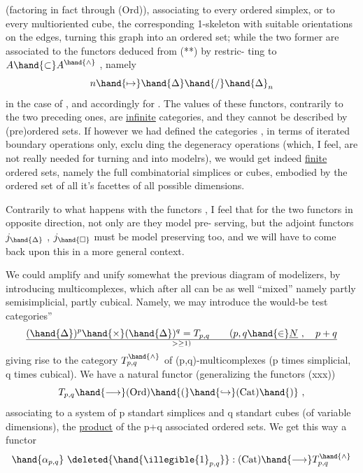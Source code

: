 (factoring in fact through (Ord)), associating to every ordered simplex,
or to every multioriented cube, \quad the corresponding 1-skeleton with suitable
orientations on the edges, turning  this graph into an ordered set; \quad while
the two former are associated to the functors deduced from (**) by restric-%
ting to $A \hand{\subset} A^{\hand{\wedge}}$ , \quad namely
\[ n \hand{\mapsto} \hand{\Delta}\hand{/}\hand{\Delta}_n \]
in the case of \hand{$\Delta$}, \quad and accordingly for \hand{$\square$}. \quad The values of these functors,
contrarily to the two preceding ones, \quad are \uline{infinite} categories, \quad and they
cannot be described by  (pre)ordered sets. \quad If however we had defined
the categories \hand{$\Delta$} , \hand{$\square$} \quad in terms of iterated boundary operations only, \quad exclu%
ding the degeneracy operations (which, \quad I feel, \quad are not really needed for
turning \hand{$\Delta^\wedge$} and \hand{$\square^\wedge$} into modelrs), \quad we would get indeed \uline{finite} ordered
sets, \quad namely the full combinatorial simplices or cubes,  embodied by the
ordered set of all it's facettes of all possible dimensions.

Contrarily to what happens with the functors \hand{$\alpha$, $\beta$}, \quad I feel that for
the two functors \hand{$\xi,\eta$} in opposite direction, \quad not only are they model pre-%
serving, \quad but the  adjoint functors \quad $j_{\hand{\Delta}}$ , $j_{\hand{\square}}$ must be model preserving too,
and we will have to come back upon this in a more general context.

We could amplify and unify somewhat the previous diagram of modelizers,
by introducing multicomplexes, \quad which after all can be as well ``mixed''
namely partly semisimplicial, \quad partly cubical. \quad Namely, \quad we may introduce
the would-be test categories'' 
\[ (\hand{\Delta})^p \hand{\times} (\hand{\Delta})^q = T_{p,q} \qquad (p,q \hand{\in} \underline{N} \ , \quad p+q \over{>}{\geq} 1) \]
giving rise to the category \quad $T^{\hand{\wedge}}_{p,q}$  \quad of (p,q)-multicomplexes (p times
simplicial, q times cubical). \quad {} We have a natural functor (generalizing
the functors (xxx))
\[ T_{p,q} \hand{\longrightarrow} \text{(Ord)} \hand{(} \hand{\hookrightarrow} \text{(Cat)} \hand{)} \ , \]
associating to a system of p standart simplices and q standart cubes
(of variable dimensions), \quad the \uline{product} of the p+q associated ordered sets.
We get this way a functor
\[ \hand{\alpha_{p,q}} \ \deleted{\hand{\illegible{1}_{p,q}}} : \text{(Cat)} \hand{\longrightarrow} T^{\hand{\wedge}}_{p,q} \]

